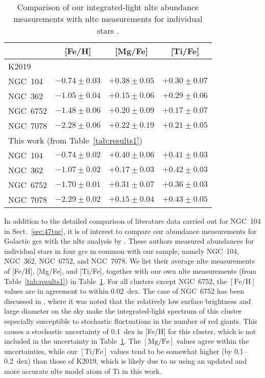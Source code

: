 \documentclass{aa}
\begin{document}
\begin{table}
\caption{Comparison of our integrated-light \ac{nlte} abundance measurements with \ac{nlte} measurements for individual stars \citep[][K2019]{Kovalev2019}.}
\label{tab:kov2019}
\centering
\begin{tabular}{lccc} \hline\hline
& [Fe/H] & [Mg/Fe] & [Ti/Fe] \\
\hline
K2019 \\
NGC~104  & $-0.74\pm0.03$ & $+0.38\pm0.05$ & $+0.30\pm0.07$ \\
NGC~362  & $-1.05\pm0.04$ & $+0.15\pm0.06$ & $+0.29\pm0.06$ \\
NGC~6752 & $-1.48\pm0.06$ & $+0.20\pm0.09$ & $+0.17\pm0.07$ \\
NGC~7078 & $-2.28\pm0.06$ & $+0.22\pm0.19$ & $+0.21\pm0.05$ \\
\multicolumn{3}{l}{This work (from Table~\ref{tab:results1})} \\
NGC~104 & $-0.74\pm0.02$ & $+0.40\pm0.06$ & $+0.41\pm0.03$ \\
NGC~362 & $-1.07\pm0.02$ & $+0.17\pm0.03$ & $+0.42\pm0.03$ \\
NGC~6752 & $-1.70\pm0.01$ & $+0.31\pm0.07$ & $+0.36\pm0.03$ \\
NGC~7078 & $-2.29\pm0.02$ & $+0.15\pm0.04$ & $+0.43\pm0.05$ \\
\hline
\end{tabular}

\end{table}

In addition to the detailed comparison of literature data carried out for NGC~104 in Sect.~\ref{sec:47tuc}, it is of interest to compare our abundance measurements for Galactic \acp{gc} with the \ac{nlte} analysis by \citet[][K2019]{Kovalev2019}. These authors measured abundances for individual stars in four \acp{gc} in common with our sample, namely NGC~104, NGC~362, NGC~6752, and NGC~7078. We list their average \ac{nlte} measurements of [Fe/H], [Mg/Fe], and [Ti/Fe], together with our own \ac{nlte} measurements (from Table~\ref{tab:results1}) in Table~\ref{tab:kov2019}. 
For all clusters except NGC~6752, the $\mathrm{[Fe/H]}$ values are in agreement to within 0.02~dex. 
The case of NGC~6752 has been discussed in , where it was noted that the relatively low surface brightness and large diameter on the sky make the integrated-light spectrum of this cluster especially susceptible to stochastic fluctuations in the number of red giants. This causes a stochastic uncertainty of 0.1~dex in [Fe/H] for this cluster, which is not included in the uncertainty in Table~\ref{tab:kov2019}. 
The $\mathrm{[Mg/Fe]}$ values agree within the uncertainties, while our $\mathrm{[Ti/Fe]}$ values tend to be somewhat higher (by 0.1--0.2~dex) than those of K2019, which is likely due to us using an updated and more accurate \ac{nlte} model atom of Ti in this work. 
\end{document}
